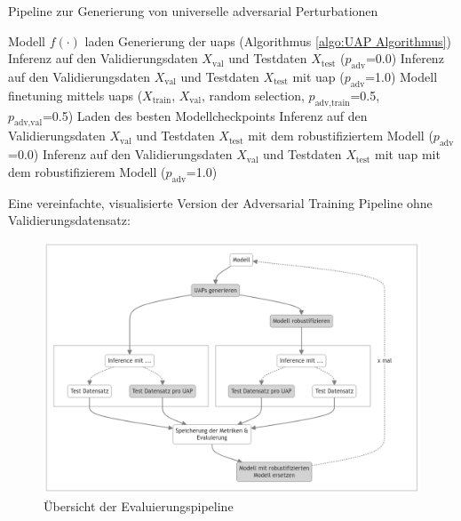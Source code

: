 \begin{algorithm}
\caption{Pipeline zur Generierung von universelle adversarial Perturbationen}
\label{alg:UAP_Adversarial_Training_Pipeline}
\begin{algorithmic}[1]
\STATE Modell $f(\cdot)$ laden
    \STATE Generierung der \acrshort{uap}s (Algorithmus \ref{algo:UAP Algorithmus})
    \STATE Inferenz auf den Validierungsdaten $X_{\text{val}}$ und Testdaten $X_{\text{test}}$ ($p_{\text{adv}}$=0.0)
        \STATE Inferenz auf den Validierungsdaten $X_{\text{val}}$ und Testdaten $X_{\text{test}}$ mit \acrshort{uap} ($p_{\text{adv}}$=1.0)
    \ENDFOR
    \STATE Modell finetuning mittels \acrshort{uap}s ($X_{\text{train}}$, $X_{\text{val}}$, random selection, $p_{\text{adv},\text{train}}$=0.5, \\
    $p_{\text{adv},\text{val}}$=0.5)
    \STATE Laden des besten Modellcheckpoints
    \STATE Inferenz auf den Validierungsdaten $X_{\text{val}}$ und Testdaten $X_{\text{test}}$ mit dem robustifiziertem Modell ($p_{\text{adv}}$=0.0)
        \STATE Inferenz auf den Validierungsdaten $X_{\text{val}}$ und Testdaten $X_{\text{test}}$ mit \acrshort{uap} mit dem robustifizierem Modell ($p_{\text{adv}}$=1.0)
    \ENDFOR
\ENDFOR
\end{algorithmic}
\end{algorithm}

Eine vereinfachte, visualisierte Version der Adversarial Training Pipeline ohne Validierungsdatensatz:

\begin{figure}[H]
    \centering
    \includegraphics[width=\linewidth]{01-images/04-methodik/robustifizierungs-pipeline.png}
    \caption{Übersicht der Evaluierungspipeline}
    \label{fig:Evaluierungspipeline}
\end{figure}

